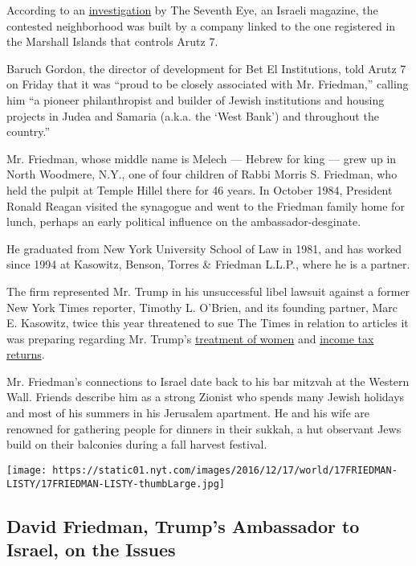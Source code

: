 According to an \href{http://www.the7eye.org.il/181976}{investigation}
by The Seventh Eye, an Israeli magazine, the contested neighborhood was
built by a company linked to the one registered in the Marshall Islands
that controls Arutz 7.

Baruch Gordon, the director of development for Bet El Institutions, told
Arutz 7 on Friday that it was ``proud to be closely associated with Mr.
Friedman,'' calling him ``a pioneer philanthropist and builder of Jewish
institutions and housing projects in Judea and Samaria (a.k.a. the `West
Bank') and throughout the country.''

Mr. Friedman, whose middle name is Melech --- Hebrew for king --- grew
up in North Woodmere, N.Y., one of four children of Rabbi Morris S.
Friedman, who held the pulpit at Temple Hillel there for 46 years. In
October 1984, President Ronald Reagan visited the synagogue and went to
the Friedman family home for lunch, perhaps an early political influence
on the ambassador-desginate.

He graduated from New York University School of Law in 1981, and has
worked since 1994 at Kasowitz, Benson, Torres \& Friedman L.L.P., where
he is a partner.

The firm represented Mr. Trump in his unsuccessful libel lawsuit against
a former New York Times reporter, Timothy L. O'Brien, and its founding
partner, Marc E. Kasowitz, twice this year threatened to sue The Times
in relation to articles it was preparing regarding Mr. Trump's
\href{https://www.nytimes.com/2016/05/15/us/politics/donald-trump-women.html}{treatment
of women} and
\href{https://www.nytimes.com/2016/10/02/us/politics/donald-trump-taxes.html?_r=0}{income
tax returns}.

Mr. Friedman's connections to Israel date back to his bar mitzvah at the
Western Wall. Friends describe him as a strong Zionist who spends many
Jewish holidays and most of his summers in his Jerusalem apartment. He
and his wife are renowned for gathering people for dinners in their
sukkah, a hut observant Jews build on their balconies during a fall
harvest festival.

\href{https://www.nytimes.com/interactive/2016/12/16/world/middleeast/David-Friedman-Israel-Palestinians-Trump-quotes.html}{}

\texttt{[image: https://static01.nyt.com/images/2016/12/17/world/17FRIEDMAN-LISTY/17FRIEDMAN-LISTY-thumbLarge.jpg]}

\hypertarget{david-friedman-trumps-ambassador-to-israel-on-the-issues}{%
\subsection{David Friedman, Trump's Ambassador to Israel, on the
Issues}\label{david-friedman-trumps-ambassador-to-israel-on-the-issues}}

